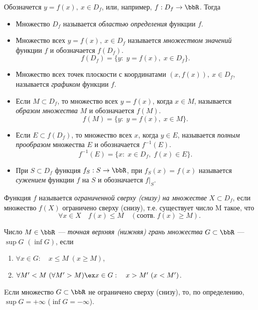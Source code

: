 Обозначется $y=f(x),\ x\in D_f$, или, например, $f: D_f \to \bbR$. Тогда
\begin{itemize}
\item
Множество $D_f$ называется \textit{областью определения} функции $f$.
\item
Множество всех $y=f(x),\ x\in D_f$ называется \textit{множеством значений} функции $f$ и обозначается $f(D_f)$. $$f(D_f)=\{y:\;y=f(x),\; x\in D_f\}.$$
\item 
Множество всех точек плоскости с координатами $(x, f(x)),\ x\in D_f$, называется \textit{графиком} функции $f$.
\item
Если $M \subset D_f$, то множество всех $y=f(x)$, когда $x\in M$, называется \textit{образом множества} $M$ и обозначается $f(M)$. $$f(M) = \{y:\;y=f(x),\; x\in M\}.$$
\item
Если $E \subset f(D_f)$, то множество всех $x$, когда $y\in E$, называется \textit{полным прообразом} множества $E$ и обозначается $f^{-1}(E)$. $$f^{-1}(E)=\{x:\;x\in D_f,\; f(x)\in E\}.$$
\item
При $S\subset D_f$ функция $f_S: S\to\bbR$, при $f_S(x)=f(x)$ называется \textit{сужением} функции $f$ на $S$ и обозначается $f\bigr|_S$.
\end{itemize}
 
 
 
 
\begin{defn}
Функция $f$ называется \textit{ограниченной сверху \textup{(}снизу\textup{)} на множестве} $X\subset D_f$, если множество $f(X)$ ограничено сверху (снизу), т.е. существует число M такое, что
$$
\forall x \in X \quad f(x) \le M \quad (\text{соотв.}\; f(x)\ge M).
$$
\end{defn}

\begin{defn}
Число $M \in \bbR$ --- \textit{точная верхняя \textup{(}нижняя\textup{)} грань множества} $G \subset \bbR$ --- $\sup G$ $(\inf G)$, если 
\begin{enumerate}
\item
$\forall x \in G:\quad x \le M \;(x\ge M)$,
\item
$\forall M' < M \ (\forall M' > M) \ex x\in G: \quad x>M' \ (x<M')$.
\end{enumerate}
\quad\textbullet\quad Eсли множество $G \subset \bbR$ не ограничено сверху (снизу), то, по определению, $\sup G=+\infty$ ($\inf G=-\infty$).  
\end{defn}

